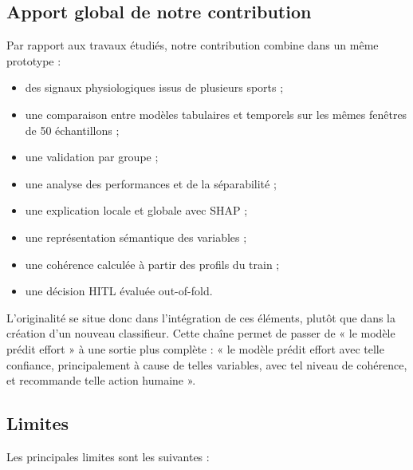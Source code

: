\documentclass[12pt,a4paper]{article}
\begin{document}
\subsection{Apport global de notre contribution}

Par rapport aux travaux étudiés, notre contribution combine dans un même
prototype :

\begin{itemize}[leftmargin=1.5em]
  \item des signaux physiologiques issus de plusieurs sports ;
  \item une comparaison entre modèles tabulaires et temporels sur les mêmes
  fenêtres de 50 échantillons ;
  \item une validation par groupe ;
  \item une analyse des performances et de la séparabilité ;
  \item une explication locale et globale avec SHAP ;
  \item une représentation sémantique des variables ;
  \item une cohérence calculée à partir des profils du train ;
  \item une décision HITL évaluée out-of-fold.
\end{itemize}

L'originalité se situe donc dans l'intégration de ces éléments, plutôt que
dans la création d'un nouveau classifieur. Cette chaîne permet de passer de
« le modèle prédit effort » à une sortie plus complète : « le modèle prédit
effort avec telle confiance, principalement à cause de telles variables, avec
tel niveau de cohérence, et recommande telle action humaine ».

\subsection{Limites}

Les principales limites sont les suivantes :
\end{document}
